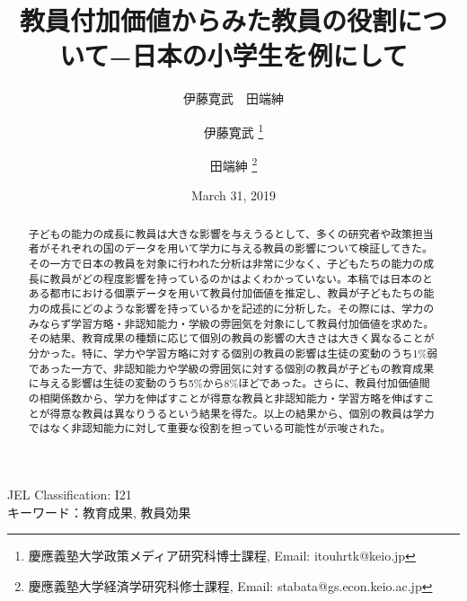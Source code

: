 \documentclass[a4paper,12pt]{article}
\title{教員付加価値からみた教員の役割について−日本の小学生を例にして}
\author{伊藤寛武　田端紳}
\author{
伊藤寛武
\thanks{慶應義塾大学政策メディア研究科博士課程, Email: itouhrtk@keio.jp
}
\and 
田端紳 
\thanks{慶應義塾大学経済学研究科修士課程, Email: stabata@gs.econ.keio.ac.jp
}
}
\date{March 31, 2019}
\begin{document}
\maketitle
\begin{abstract}
子どもの能力の成長に教員は大きな影響を与えうるとして、多くの研究者や政策担当者がそれぞれの国のデータを用いて学力に与える教員の影響について検証してきた。その一方で日本の教員を対象に行われた分析は非常に少なく、子どもたちの能力の成長に教員がどの程度影響を持っているのかはよくわかっていない。本稿では日本のとある都市における個票データを用いて教員付加価値を推定し、教員が子どもたちの能力の成長にどのような影響を持っているかを記述的に分析した。その際には、学力のみならず学習方略・非認知能力・学級の雰囲気を対象にして教員付加価値を求めた。その結果、教育成果の種類に応じて個別の教員の影響の大きさは大きく異なることが分かった。特に、学力や学習方略に対する個別の教員の影響は生徒の変動のうち1\%弱であった一方で、非認知能力や学級の雰囲気に対する個別の教員が子どもの教育成果に与える影響は生徒の変動のうち5\%から8\%ほどであった。さらに、教員付加価値間の相関係数から、学力を伸ばすことが得意な教員と非認知能力・学習方略を伸ばすことが得意な教員は異なりうるという結果を得た。以上の結果から、個別の教員は学力ではなく非認知能力に対して重要な役割を担っている可能性が示唆された。
\end{abstract}

JEL Classification: I21\\
キーワード：教育成果, 教員効果

\newpage
\end{document}
